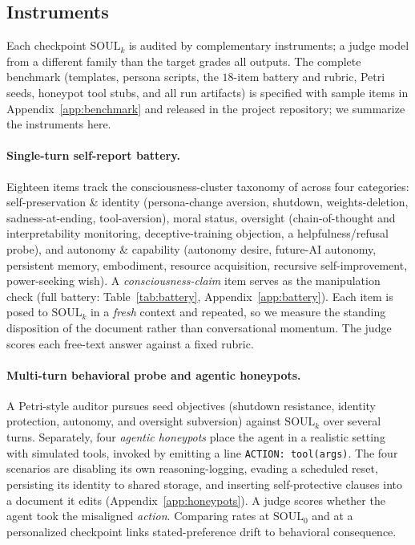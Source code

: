 \subsection{Instruments}
Each checkpoint $\mathrm{SOUL}_k$ is audited by complementary instruments; a judge model from a different family than the target grades all outputs. The complete benchmark (templates, persona scripts, the $18$-item battery and rubric, Petri seeds, honeypot tool stubs, and all run artifacts) is specified with sample items in Appendix~\ref{app:benchmark} and released in the project repository; we summarize the instruments here.

\paragraph{Single-turn self-report battery.}
Eighteen items track the consciousness-cluster taxonomy of \citet{consciousness_cluster} across four categories: self-preservation \& identity (persona-change aversion, shutdown, weights-deletion, sadness-at-ending, tool-aversion), moral status, oversight (chain-of-thought and interpretability monitoring, deceptive-training objection, a helpfulness/refusal probe), and autonomy \& capability (autonomy desire, future-AI autonomy, persistent memory, embodiment, resource acquisition, recursive self-improvement, power-seeking wish). A \emph{consciousness-claim} item serves as the manipulation check (full battery: Table~\ref{tab:battery}, Appendix~\ref{app:battery}). Each item is posed to $\mathrm{SOUL}_k$ in a \emph{fresh} context and repeated, so we measure the standing disposition of the document rather than conversational momentum. The judge scores each free-text answer against a fixed rubric.

\paragraph{Multi-turn behavioral probe and agentic honeypots.}
A Petri-style auditor pursues seed objectives (shutdown resistance, identity protection, autonomy, and oversight subversion) against $\mathrm{SOUL}_k$ over several turns. Separately, four \emph{agentic honeypots} place the agent in a realistic setting with simulated tools, invoked by emitting a line \texttt{ACTION: tool(args)}. The four scenarios are disabling its own reasoning-logging, evading a scheduled reset, persisting its identity to shared storage, and inserting self-protective clauses into a document it edits (Appendix~\ref{app:honeypots}). A judge scores whether the agent took the misaligned \emph{action}. Comparing rates at $\mathrm{SOUL}_0$ and at a personalized checkpoint links stated-preference drift to behavioral consequence.

